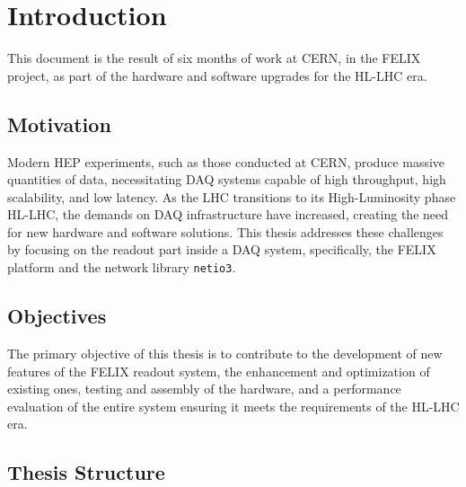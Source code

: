 \chapter{Introduction}

This document is the result of six months of work at \acs{CERN}, in the \acs{FELIX} project, as part of the hardware and software upgrades for the \acl{HL-LHC} era.

\section{Motivation}

Modern \acl{HEP} experiments, such as those conducted at \acf{CERN}, produce massive quantities of data, necessitating \acf{DAQ} systems capable of high throughput, high scalability, and low latency. As the \acf{LHC} transitions to its High-Luminosity phase \acs{HL-LHC}, the demands on \acs{DAQ} infrastructure have increased, creating the need for new hardware and software solutions. This thesis addresses these challenges by focusing on the readout part inside a \acl{DAQ} system, specifically, the \acs{FELIX} platform and the network library \texttt{netio3}.

\section{Objectives}

The primary objective of this thesis is to contribute to the development of new features of the \acs{FELIX} readout system, the enhancement and optimization of existing ones, testing and assembly of the hardware, and a performance evaluation of the entire system ensuring it meets the requirements of the \acs{HL-LHC} era.

\section{Thesis Structure}

